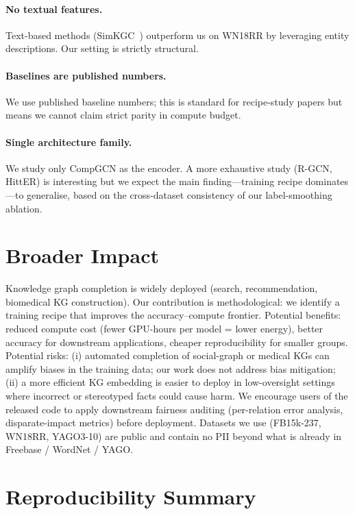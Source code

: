 \paragraph{No textual features.}
Text-based methods (SimKGC~\citep{simkgc2022}) outperform us on WN18RR by leveraging entity descriptions. Our setting is strictly structural.

\paragraph{Baselines are published numbers.}
We use published baseline numbers; this is standard for recipe-study papers but means we cannot claim strict parity in compute budget.

\paragraph{Single architecture family.}
We study only CompGCN as the encoder. A more exhaustive study (R-GCN, HittER) is interesting but we expect the main finding---training recipe dominates---to generalise, based on the cross-dataset consistency of our label-smoothing ablation.

\section{Broader Impact}
\label{app:impact}

Knowledge graph completion is widely deployed (search, recommendation, biomedical KG construction).
Our contribution is methodological: we identify a training recipe that improves the accuracy--compute frontier.
Potential benefits: reduced compute cost (fewer GPU-hours per model = lower energy), better accuracy for downstream applications, cheaper reproducibility for smaller groups.
Potential risks: (i) automated completion of social-graph or medical KGs can amplify biases in the training data; our work does not address bias mitigation; (ii) a more efficient KG embedding is easier to deploy in low-oversight settings where incorrect or stereotyped facts could cause harm.
We encourage users of the released code to apply downstream fairness auditing (\eg per-relation error analysis, disparate-impact metrics) before deployment.
Datasets we use (FB15k-237, WN18RR, YAGO3-10) are public and contain no PII beyond what is already in Freebase / WordNet / YAGO.

\section{Reproducibility Summary}
\label{app:repro}

